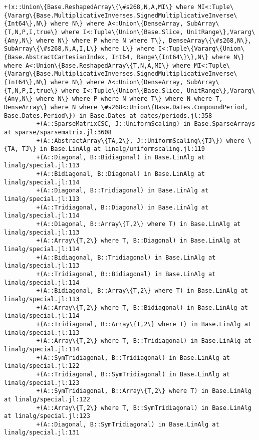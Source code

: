 \documentclass[11pt]{article}
\begin{document}
\begin{Verbatim}[commandchars=\\\{\}]
         +(x::Union\{Base.ReshapedArray\{\#s268,N,A,MI\} where MI<:Tuple\{Vararg\{Base.MultiplicativeInverses.SignedMultiplicativeInverse\{Int64\},N\} where N\} where A<:Union\{DenseArray, SubArray\{T,N,P,I,true\} where I<:Tuple\{Union\{Base.Slice, UnitRange\},Vararg\{Any,N\} where N\} where P where N where T\}, DenseArray\{\#s268,N\}, SubArray\{\#s268,N,A,I,L\} where L\} where I<:Tuple\{Vararg\{Union\{Base.AbstractCartesianIndex, Int64, Range\{Int64\}\},N\} where N\} where A<:Union\{Base.ReshapedArray\{T,N,A,MI\} where MI<:Tuple\{Vararg\{Base.MultiplicativeInverses.SignedMultiplicativeInverse\{Int64\},N\} where N\} where A<:Union\{DenseArray, SubArray\{T,N,P,I,true\} where I<:Tuple\{Union\{Base.Slice, UnitRange\},Vararg\{Any,N\} where N\} where P where N where T\} where N where T, DenseArray\} where N where \#s268<:Union\{Base.Dates.CompoundPeriod, Base.Dates.Period\}) in Base.Dates at dates/periods.jl:358
         +(A::SparseMatrixCSC, J::UniformScaling) in Base.SparseArrays at sparse/sparsematrix.jl:3608
         +(A::AbstractArray\{TA,2\}, J::UniformScaling\{TJ\}) where \{TA, TJ\} in Base.LinAlg at linalg/uniformscaling.jl:119
         +(A::Diagonal, B::Bidiagonal) in Base.LinAlg at linalg/special.jl:113
         +(A::Bidiagonal, B::Diagonal) in Base.LinAlg at linalg/special.jl:114
         +(A::Diagonal, B::Tridiagonal) in Base.LinAlg at linalg/special.jl:113
         +(A::Tridiagonal, B::Diagonal) in Base.LinAlg at linalg/special.jl:114
         +(A::Diagonal, B::Array\{T,2\} where T) in Base.LinAlg at linalg/special.jl:113
         +(A::Array\{T,2\} where T, B::Diagonal) in Base.LinAlg at linalg/special.jl:114
         +(A::Bidiagonal, B::Tridiagonal) in Base.LinAlg at linalg/special.jl:113
         +(A::Tridiagonal, B::Bidiagonal) in Base.LinAlg at linalg/special.jl:114
         +(A::Bidiagonal, B::Array\{T,2\} where T) in Base.LinAlg at linalg/special.jl:113
         +(A::Array\{T,2\} where T, B::Bidiagonal) in Base.LinAlg at linalg/special.jl:114
         +(A::Tridiagonal, B::Array\{T,2\} where T) in Base.LinAlg at linalg/special.jl:113
         +(A::Array\{T,2\} where T, B::Tridiagonal) in Base.LinAlg at linalg/special.jl:114
         +(A::SymTridiagonal, B::Tridiagonal) in Base.LinAlg at linalg/special.jl:122
         +(A::Tridiagonal, B::SymTridiagonal) in Base.LinAlg at linalg/special.jl:123
         +(A::SymTridiagonal, B::Array\{T,2\} where T) in Base.LinAlg at linalg/special.jl:122
         +(A::Array\{T,2\} where T, B::SymTridiagonal) in Base.LinAlg at linalg/special.jl:123
         +(A::Diagonal, B::SymTridiagonal) in Base.LinAlg at linalg/special.jl:131

\end{Verbatim}
\end{document}
